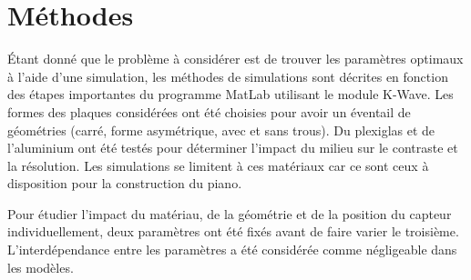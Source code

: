 \documentclass[conference]{IEEEtran}
\begin{document}
\section{Méthodes \label{methodes}}


Étant donné que le problème à considérer est de trouver les paramètres 
optimaux à l'aide d'une simulation, les méthodes de simulations sont décrites
en fonction des étapes importantes du programme MatLab utilisant le module K-Wave.
Les formes des plaques considérées ont été choisies pour avoir un éventail de 
géométries (carré, forme asymétrique, avec et sans trous). Du plexiglas et de 
l'aluminium ont été testés pour déterminer l'impact du milieu sur le contraste et la résolution. 
Les simulations se limitent à ces matériaux car ce sont ceux à disposition 
pour la construction du piano.

Pour étudier l'impact du matériau, de la géométrie et de la position du capteur
individuellement, deux paramètres ont été fixés avant de faire varier le troisième. 
L'interdépendance entre les paramètres a été considérée comme négligeable dans 
les modèles.
\end{document}
